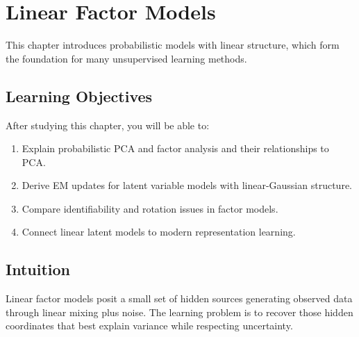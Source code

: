 
\chapter{Linear Factor Models}
\label{chap:linear-factor-models}

This chapter introduces probabilistic models with linear structure, which form the foundation for many unsupervised learning methods.


\section*{Learning Objectives}

After studying this chapter, you will be able to:

\begin{enumerate}
    \item Explain probabilistic PCA and factor analysis and their relationships to PCA.
    \item Derive EM updates for latent variable models with linear-Gaussian structure.
    \item Compare identifiability and rotation issues in factor models.
    \item Connect linear latent models to modern representation learning.
\end{enumerate}



\section*{Intuition}

Linear factor models posit a small set of hidden sources generating observed data through linear mixing plus noise. The learning problem is to recover those hidden coordinates that best explain variance while respecting uncertainty.












